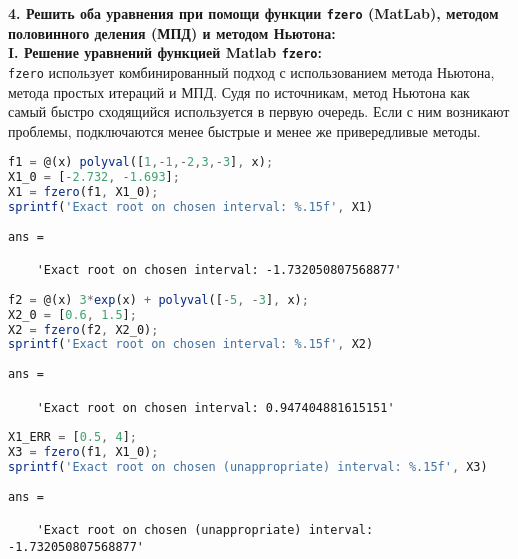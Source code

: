 \newpage

{\Large{\textbf{4. Решить оба уравнения при помощи функции \texttt{fzero} (MatLab), методом половинного деления (МПД) и методом Ньютона:}}}\\

{\large\bf{I. Решение уравнений функцией Matlab \texttt{fzero}:}}\\
\texttt{fzero} использует комбинированный подход с использованием метода Ньютона, метода простых итераций и МПД. Судя по источникам, метод Ньютона как самый быстро сходящийся используется в первую очередь. Если с ним возникают проблемы, подключаются менее быстрые и менее же привередливые методы.

\begin{lstlisting}[language=Octave]
% Polynomial function
f1 = @(x) polyval([1,-1,-2,3,-3], x);
X1_0 = [-2.732, -1.693];
X1 = fzero(f1, X1_0);
sprintf('Exact root on chosen interval: %.15f', X1)
\end{lstlisting}
{\singlespacing
\begin{verbatim}
ans =

    'Exact root on chosen interval: -1.732050807568877'
\end{verbatim}}
\begin{lstlisting}[language=Octave, firstnumber=6]
% Transcendental function
f2 = @(x) 3*exp(x) + polyval([-5, -3], x);
X2_0 = [0.6, 1.5];
X2 = fzero(f2, X2_0);
sprintf('Exact root on chosen interval: %.15f', X2)
\end{lstlisting}
{\singlespacing
\begin{verbatim}
ans =

    'Exact root on chosen interval: 0.947404881615151'
\end{verbatim}}
\begin{lstlisting}[language=Octave, firstnumber=11]
% Root for interval, where Newton method conditions violate
X1_ERR = [0.5, 4];
X3 = fzero(f1, X1_0);
sprintf('Exact root on chosen (unappropriate) interval: %.15f', X3)
\end{lstlisting}
{\singlespacing
    \begin{verbatim}
ans =

    'Exact root on chosen (unappropriate) interval: -1.732050807568877'
\end{verbatim}}

\newpage

